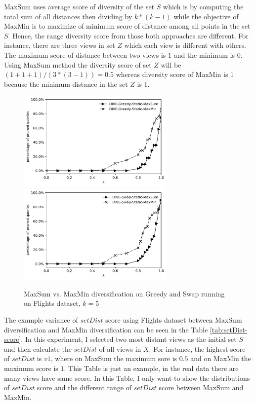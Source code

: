 \documentclass{article}
\begin{document}
MaxSum uses average score of diversity of the set $ S $ which is by computing the total sum of all distances then dividing by $ k*(k-1) $ while the objective of MaxMin is to maximize of minimum score of distance among all points in the set $ S $.  Hence, the range diversity score from those both approaches are different. For instance, there are three views in set $ Z $ which each view is different with others. The maximum score of distance between two views is $ 1 $ and the minimum is $ 0 $. Using MaxSum method the diversity score of set $ Z $ will be $ (1+1+1)/(3*(3-1)) = 0.5 $ whereas diversity score of MaxMin is $ 1 $ because the minimum distance in the set $ Z $ is $ 1 $. 


\begin{figure}
	\begin{center}
		\includegraphics[width=3.0in]{figures/MaxSum_MaxMin_Greedy}
		\includegraphics[width=3.0in]{figures/MaxSum_MaxMin_Swap}
		\caption{MaxSum vs. MaxMin diversification on Greedy and Swap running on Flights dataset, $k = 5$}
		\label{fig:maxsum-maxmin-greedy-swap}
	\end{center}
\end{figure}




The example variance of $ setDist $ score using Flights dataset between MaxSum diversification and MaxMin diversification can be seen in the Table \ref{tab:setDist-score}. In this experiment, I selected two most distant views as the initial set $ S $ and then calculate the $ setDist $ of all views in $ X $. For instance, the highest score of $ setDist $ is $ v1 $, where on MaxSum the maximum sore is $ 0.5 $ and on MaxMin the maximum score is $ 1 $. This Table is just an example, in the real data there are many views have same score. In this Table, I only want to show the distributions of $ setDist $ score and the different range of $ setDist $ score between MaxSum and MaxMin. 
\end{document}
